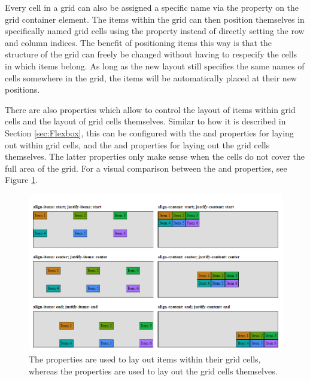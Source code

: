 Every cell in a grid can also be assigned a specific name via the  property on the grid container element. 
The items within the grid can then position themselves in specifically named grid cells using the  property instead of directly setting the row and column indices. 
The benefit of positioning items this way is that the structure of the grid can freely be changed without having to respecify the cells in which items belong. 
As long as the new layout still specifies the same names of cells somewhere in the grid, the items will be automatically placed at their new positions.

There are also properties which allow to control the layout of items within grid cells and the layout of grid cells themselves. 
Similar to how it is described in Section \ref{sec:Flexbox}, this can be configured with the  and  properties for laying out within grid cells, and the  and  properties for laying out the grid cells themselves. 
The latter  properties only make sense when the cells do not cover the full area of the grid. 
For a visual comparison between the  and  properties, see Figure \ref{fig:GridLayoutProperties}.

\begin{figure}[tp]
\centering
\includegraphics[keepaspectratio,width=\linewidth,height=\fullh / 2]{images/grid-layout-properties.png}
\caption[Grid Layout Property Comparision]{
  The  properties are used to lay out items within their grid cells, whereas the  properties are used to lay out the grid cells themselves. 
}
\label{fig:GridLayoutProperties}
\end{figure}

